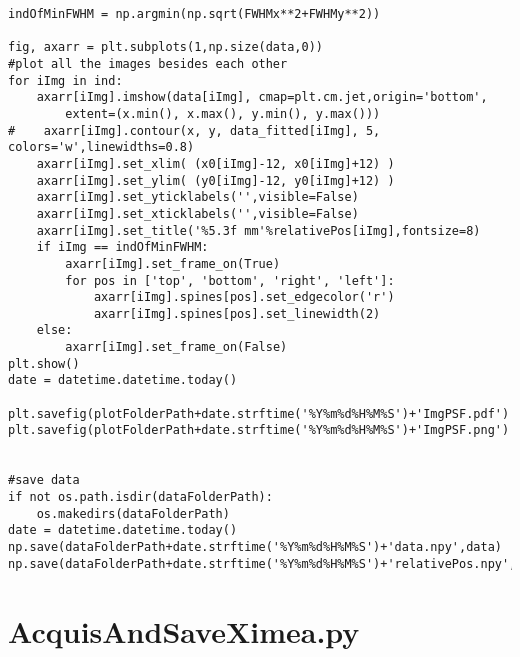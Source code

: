 \begin{lstlisting}
indOfMinFWHM = np.argmin(np.sqrt(FWHMx**2+FWHMy**2))

fig, axarr = plt.subplots(1,np.size(data,0))
#plot all the images besides each other
for iImg in ind:
    axarr[iImg].imshow(data[iImg], cmap=plt.cm.jet,origin='bottom',
        extent=(x.min(), x.max(), y.min(), y.max()))
#    axarr[iImg].contour(x, y, data_fitted[iImg], 5, colors='w',linewidths=0.8)
    axarr[iImg].set_xlim( (x0[iImg]-12, x0[iImg]+12) )
    axarr[iImg].set_ylim( (y0[iImg]-12, y0[iImg]+12) )
    axarr[iImg].set_yticklabels('',visible=False)
    axarr[iImg].set_xticklabels('',visible=False)
    axarr[iImg].set_title('%5.3f mm'%relativePos[iImg],fontsize=8)
    if iImg == indOfMinFWHM:
        axarr[iImg].set_frame_on(True)
        for pos in ['top', 'bottom', 'right', 'left']:
            axarr[iImg].spines[pos].set_edgecolor('r')
            axarr[iImg].spines[pos].set_linewidth(2)
    else:
        axarr[iImg].set_frame_on(False)
plt.show()
date = datetime.datetime.today()

plt.savefig(plotFolderPath+date.strftime('%Y%m%d%H%M%S')+'ImgPSF.pdf')
plt.savefig(plotFolderPath+date.strftime('%Y%m%d%H%M%S')+'ImgPSF.png')


#save data
if not os.path.isdir(dataFolderPath):
    os.makedirs(dataFolderPath)
date = datetime.datetime.today()
np.save(dataFolderPath+date.strftime('%Y%m%d%H%M%S')+'data.npy',data)
np.save(dataFolderPath+date.strftime('%Y%m%d%H%M%S')+'relativePos.npy',relativePos)
\end{lstlisting}

\section{AcquisAndSaveXimea.py}
\label{app:AcquisAndSaveXimea}

